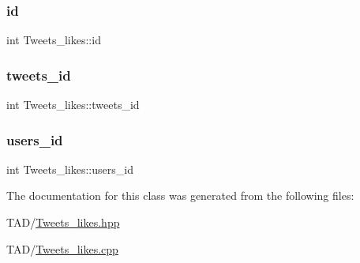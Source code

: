 \subsubsection{\texorpdfstring{id}{id}}
{\footnotesize\ttfamily int Tweets\+\_\+likes\+::id\hspace{0.3cm}{\ttfamily [private]}}

\mbox{\label{class_tweets__likes_a092209fd2e34feebf6df7614c1803d36}} 
\subsubsection{\texorpdfstring{tweets\+\_\+id}{tweets\_id}}
{\footnotesize\ttfamily int Tweets\+\_\+likes\+::tweets\+\_\+id\hspace{0.3cm}{\ttfamily [private]}}

\mbox{\label{class_tweets__likes_accb88ebacd1e5eeefadbdddfb7c10e8e}} 
\subsubsection{\texorpdfstring{users\+\_\+id}{users\_id}}
{\footnotesize\ttfamily int Tweets\+\_\+likes\+::users\+\_\+id\hspace{0.3cm}{\ttfamily [private]}}



The documentation for this class was generated from the following files\+:\begin{DoxyCompactItemize}
\item 
T\+A\+D/\hyperlink{_tweets__likes_8hpp}{Tweets\+\_\+likes.\+hpp}\item 
T\+A\+D/\hyperlink{_tweets__likes_8cpp}{Tweets\+\_\+likes.\+cpp}\end{DoxyCompactItemize}
